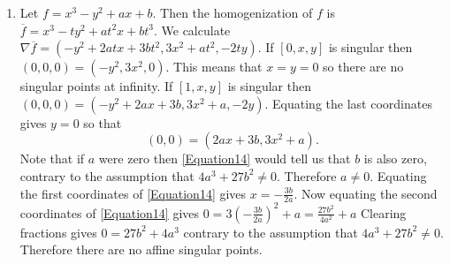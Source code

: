 \documentclass[12pt]{article}
\begin{document}
\begin{enumerate}
\item %
Let $f=x^3-y^2+ax+b$. Then the homogenization of $f$
is $\overline{f}=x^3-ty^2+at^2x+bt^3$. We calculate
$\nabla\overline{f}=\left(-y^2+2atx+3bt^2,3x^2+at^2,-2ty\right)$.
If $\left[0,x,y\right]$ is singular then
$\left(0,0,0\right)=\left(-y^2,3x^2,0\right)$.
This means that $x=y=0$ so there are no singular points at infinity.
If $\left[1,x,y\right]$ is singular then
$\left(0,0,0\right)=\left(-y^2+2ax+3b,3x^2+a,-2y\right)$.
Equating the last coordinates gives $y=0$ so that
\begin{equation}\label{Equation14}
\left(0,0\right)=\left(2ax+3b,3x^2+a\right).
\end{equation}
Note that if $a$ were zero then \autoref{Equation14}
would tell us that $b$ is also zero, contrary to the
assumption that $4a^3+27b^2\ne 0$. Therefore $a\ne 0$.
Equating the first coordinates of \autoref{Equation14}
gives $x=-\frac{3b}{2a}$.
Now equating the second coordinates of \autoref{Equation14}
gives $0=3\left(-\frac{3b}{2a}\right)^2+a=\frac{27b^2}{4a^2}+a$
Clearing fractions gives $0=27b^2+4a^3$ contrary to the
assumption that $4a^3+27b^2\ne 0$. Therefore there are no
affine singular points.
\end{enumerate}
\end{document}
